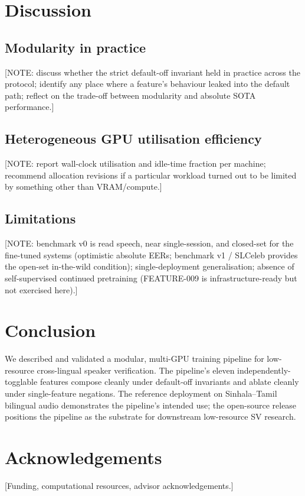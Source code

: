 \documentclass[11pt,a4paper]{article}
\begin{document}
\section{Discussion}
\label{sec:discussion}

\subsection{Modularity in practice}

[NOTE: discuss whether the strict default-off invariant held in
practice across the protocol; identify any place where a feature's
behaviour leaked into the default path; reflect on the trade-off
between modularity and absolute SOTA performance.]

\subsection{Heterogeneous GPU utilisation efficiency}

[NOTE: report wall-clock utilisation and idle-time fraction per
machine; recommend allocation revisions if a particular workload
turned out to be limited by something other than VRAM/compute.]

\subsection{Limitations}

[NOTE: benchmark v0 is read speech, near single-session, and
closed-set for the fine-tuned systems (optimistic absolute EERs;
benchmark v1 / SLCeleb provides the open-set in-the-wild condition);
single-deployment generalisation; absence of self-supervised continued
pretraining (FEATURE-009 is infrastructure-ready but not exercised
here).]

\section{Conclusion}
\label{sec:conclusion}

We described and validated a modular, multi-GPU training pipeline for
low-resource cross-lingual speaker verification. The pipeline's eleven
independently-togglable features compose cleanly under default-off
invariants and ablate cleanly under single-feature negations. The
reference deployment on Sinhala--Tamil bilingual audio demonstrates the
pipeline's intended use; the open-source release positions the
pipeline as the substrate for downstream low-resource SV research.

\section*{Acknowledgements}
[Funding, computational resources, advisor acknowledgements.]



\end{document}
